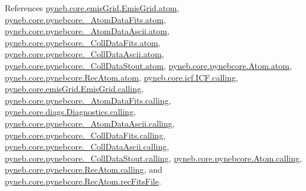 References \hyperlink{emis_grid_8py_source_l00051}{pyneb.\-core.\-emis\-Grid.\-Emis\-Grid.\-atom}, \hyperlink{pynebcore_8py_source_l00089}{pyneb.\-core.\-pynebcore.\-\_\-\-Atom\-Data\-Fits.\-atom}, \hyperlink{pynebcore_8py_source_l00310}{pyneb.\-core.\-pynebcore.\-\_\-\-Atom\-Data\-Ascii.\-atom}, \hyperlink{pynebcore_8py_source_l00576}{pyneb.\-core.\-pynebcore.\-\_\-\-Coll\-Data\-Fits.\-atom}, \hyperlink{pynebcore_8py_source_l00926}{pyneb.\-core.\-pynebcore.\-\_\-\-Coll\-Data\-Ascii.\-atom}, \hyperlink{pynebcore_8py_source_l01162}{pyneb.\-core.\-pynebcore.\-\_\-\-Coll\-Data\-Stout.\-atom}, \hyperlink{pynebcore_8py_source_l01218}{pyneb.\-core.\-pynebcore.\-Atom.\-atom}, \hyperlink{pynebcore_8py_source_l02635}{pyneb.\-core.\-pynebcore.\-Rec\-Atom.\-atom}, \hyperlink{icf_8py_source_l00016}{pyneb.\-core.\-icf.\-I\-C\-F.\-calling}, \hyperlink{emis_grid_8py_source_l00044}{pyneb.\-core.\-emis\-Grid.\-Emis\-Grid.\-calling}, \hyperlink{pynebcore_8py_source_l00097}{pyneb.\-core.\-pynebcore.\-\_\-\-Atom\-Data\-Fits.\-calling}, \hyperlink{diags_8py_source_l00169}{pyneb.\-core.\-diags.\-Diagnostics.\-calling}, \hyperlink{pynebcore_8py_source_l00318}{pyneb.\-core.\-pynebcore.\-\_\-\-Atom\-Data\-Ascii.\-calling}, \hyperlink{pynebcore_8py_source_l00585}{pyneb.\-core.\-pynebcore.\-\_\-\-Coll\-Data\-Fits.\-calling}, \hyperlink{pynebcore_8py_source_l00936}{pyneb.\-core.\-pynebcore.\-\_\-\-Coll\-Data\-Ascii.\-calling}, \hyperlink{pynebcore_8py_source_l01156}{pyneb.\-core.\-pynebcore.\-\_\-\-Coll\-Data\-Stout.\-calling}, \hyperlink{pynebcore_8py_source_l01229}{pyneb.\-core.\-pynebcore.\-Atom.\-calling}, \hyperlink{pynebcore_8py_source_l02643}{pyneb.\-core.\-pynebcore.\-Rec\-Atom.\-calling}, and \hyperlink{pynebcore_8py_source_l02646}{pyneb.\-core.\-pynebcore.\-Rec\-Atom.\-rec\-Fits\-File}.


